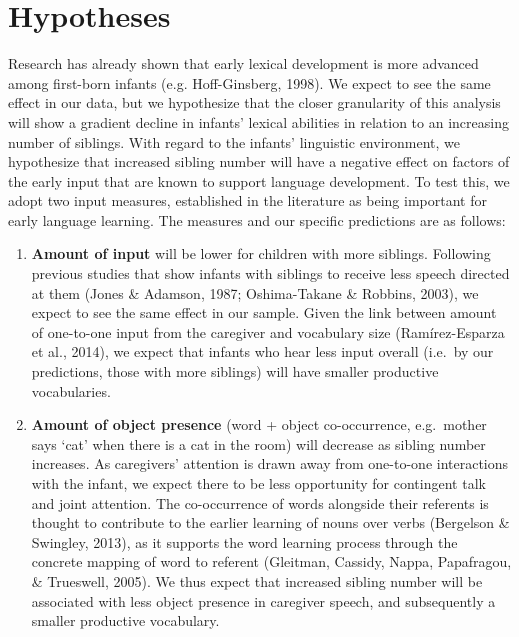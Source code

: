 \documentclass[
  man,floatsintext]{apa6}
\providecommand{\tightlist}{%
  \setlength{\itemsep}{0pt}\setlength{\parskip}{0pt}}
\begin{document}
\hypertarget{hypotheses}{%
\section{Hypotheses}\label{hypotheses}}

Research has already shown that early lexical development is more advanced among first-born infants (e.g. Hoff-Ginsberg, 1998). We expect to see the same effect in our data, but we hypothesize that the closer granularity of this analysis will show a gradient decline in infants' lexical abilities in relation to an increasing number of siblings.
With regard to the infants' linguistic environment, we hypothesize that increased sibling number will have a negative effect on factors of the early input that are known to support language development. To test this, we adopt two input measures, established in the literature as being important for early language learning. The measures and our specific predictions are as follows:

\begin{enumerate}
\def\labelenumi{\arabic{enumi})}
\tightlist
\item
  \textbf{Amount of input} will be lower for children with more siblings. Following previous studies that show infants with siblings to receive less speech directed at them (Jones \& Adamson, 1987; Oshima-Takane \& Robbins, 2003), we expect to see the same effect in our sample. Given the link between amount of one-to-one input from the caregiver and vocabulary size (Ramírez-Esparza et al., 2014), we expect that infants who hear less input overall (i.e.~by our predictions, those with more siblings) will have smaller productive vocabularies.
\item
  \textbf{Amount of object presence} (word + object co-occurrence, e.g.~mother says `cat' when there is a cat in the room) will decrease as sibling number increases. As caregivers' attention is drawn away from one-to-one interactions with the infant, we expect there to be less opportunity for contingent talk and joint attention. The co-occurrence of words alongside their referents is thought to contribute to the earlier learning of nouns over verbs (Bergelson \& Swingley, 2013), as it supports the word learning process through the concrete mapping of word to referent (Gleitman, Cassidy, Nappa, Papafragou, \& Trueswell, 2005). We thus expect that increased sibling number will be associated with less object presence in caregiver speech, and subsequently a smaller productive vocabulary.
\end{enumerate}
\end{document}
